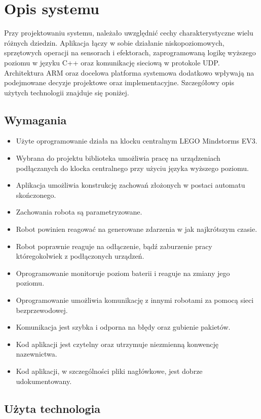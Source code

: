 \chapter{Opis systemu}
\label{ch:opis_systemu}

Przy projektowaniu systemu, należało uwzględnić cechy charakterystyczne wielu różnych dziedzin. Aplikacja łączy w sobie działanie niskopoziomowych, sprzętowych operacji na sensorach i efektorach, zaprogramowaną logikę wyższego poziomu w języku C++ oraz komunikację sieciową w protokole UDP. Architektura ARM oraz docelowa platforma systemowa dodatkowo wpływają na podejmowane decyzje projektowe oraz implementacyjne. Szczegółowy opis użytych technologii znajduje się poniżej.

\section{Wymagania}
\begin{itemize}
    \item Użyte oprogramowanie działa na klocku centralnym LEGO Mindstorms EV3.
    \item Wybrana do projektu biblioteka umożliwia pracę na urządzeniach podłączanych do klocka centralnego przy użyciu języka wyższego poziomu.
    \item Aplikacja umożliwia konstrukcję zachowań złożonych w postaci automatu skończonego.
    \item Zachowania robota są parametryzowane.
    \item Robot powinien reagować na generowane zdarzenia w jak najkrótszym czasie.
    \item Robot poprawnie reaguje na odłączenie, bądź zaburzenie pracy któregokolwiek z podłączonych urządzeń.
    \item Oprogramowanie monitoruje poziom baterii i reaguje na zmiany jego poziomu.
    \item Oprogramowanie umożliwia komunikację z innymi robotami za pomocą sieci bezprzewodowej.
    \item Komunikacja jest szybka i odporna na błędy oraz gubienie pakietów.
    \item Kod aplikacji jest czytelny oraz utrzymuje niezmienną konwencję nazewnictwa.
    \item Kod aplikacji, w szczególności pliki nagłówkowe, jest dobrze udokumentowany.
\end{itemize}

\section{Użyta technologia}


